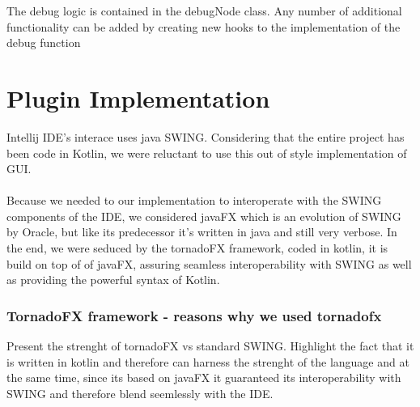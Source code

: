 	The debug logic is contained in the debugNode class. Any number of additional functionality can be added by creating new hooks to the implementation of the debug function



	\section{Plugin Implementation}
	Intellij IDE's interace uses java SWING. Considering that the entire project has been code in Kotlin, we were reluctant to use this out of style implementation of GUI.

	\paragraph{}

 	Because we needed to our implementation to interoperate with the SWING components of the IDE, we considered javaFX \cite{oracle_javafx} which is an evolution of SWING by Oracle, but like its predecessor it's written in java and still very verbose. In the end, we were seduced by the tornadoFX \cite{tornadofx} framework, coded in kotlin, it is build on top of of javaFX, assuring seamless interoperability with SWING as well as providing the powerful syntax of Kotlin.

		\subsubsection{TornadoFX framework - reasons why we used tornadofx}
		Present the strenght of tornadoFX vs standard SWING. Highlight the fact that it is written in kotlin and therefore can harness the strenght of the language and at the same time, since its based on javaFX it guaranteed its interoperability with SWING and therefore blend seemlessly with the IDE.

